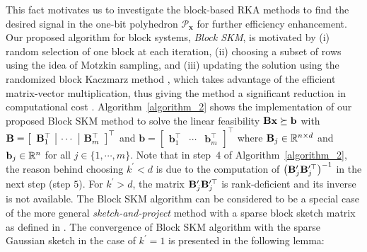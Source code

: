 \documentclass[12pt,draftcls,onecolumn]{IEEEtran}
\begin{document}
This fact motivates us 
to investigate the block-based RKA methods to find the desired signal in the one-bit polyhedron $\mathcal{P}_{\mathbf{x}}$ for further efficiency enhancement. Our proposed algorithm for block systems, \emph{Block SKM}, is motivated by (i) random selection of one block at each iteration, (ii) choosing a subset of rows using the idea of Motzkin sampling, and (iii) updating the solution using the randomized block Kaczmarz method \cite{elfving1980block,needell2014paved}, which takes advantage of the efficient matrix-vector multiplication, thus giving the method a significant reduction in computational cost \cite{briskman2015block}. Algorithm~\ref{algorithm_2} shows the implementation of our proposed Block SKM method to solve the linear feasibility $\mathbf{B}\mathbf{x}\succeq\mathbf{b}$ with $\mathbf{B}=\left[\begin{array}{c|c|c}\mathbf{B}^{\top}_{1} &\cdots&\mathbf{B}^{\top}_{m}\end{array}\right]^{\top}$ and $\mathbf{b}=\left[\begin{array}{c|c|c}\mathbf{b}^{\top}_{1} &\cdots&\mathbf{b}^{\top}_{m}\end{array}\right]^{\top}$ where $\mathbf{B}_{j}\in\mathbb{R}^{n\times d}$ and $\mathbf{b}_{j}\in\mathbb{R}^{n}$ for all $j\in\{1,\cdots,m\}$. Note that in step~$4$ of Algorithm~\ref{algorithm_2}, the reason behind choosing $k^{\prime}<d$ is due to the computation of $\left(\mathbf{B}_{j}^{\prime}\mathbf{B}_{j}^{\prime\top}\right)^{-1}$ in the next step (step $5$). For $k^{\prime}>d$, the matrix $\mathbf{B}_{j}^{\prime}\mathbf{B}_{j}^{\prime\top}$ is rank-deficient and its inverse is not available. The Block SKM algorithm can be considered to be a special case of the more general \emph{sketch-and-project} method with a sparse block sketch matrix as defined in \cite{derezinski2022sharp}. The convergence of Block SKM algorithm
with the sparse Gaussian sketch in the case of $k^{\prime}=1$ is presented in the following lemma:
\end{document}
